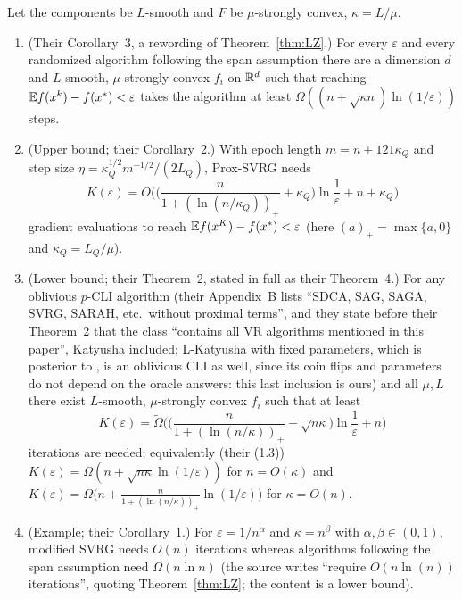 \begin{theorem}
\label{thm:HLOY}
Let the components be $L$-smooth and $F$ be $\mu$-strongly convex, $\kappa=L/\mu$.
\begin{enumerate}[nosep,label=(\alph*)]
\item (Their Corollary~3, a rewording of Theorem~\ref{thm:LZ}.) For every $\varepsilon$ and every randomized algorithm following the span assumption there are a dimension $d$ and $L$-smooth, $\mu$-strongly convex $f_i$ on $\mathbb{R}^d$ such that reaching $\mathbb{E} f(x^k)-f(x^\ast)<\varepsilon$ takes the algorithm at least $\Omega((n+\sqrt{\kappa n})\ln(1/\varepsilon))$ steps.
\item (Upper bound; their Corollary~2.) With epoch length $m=n+121\kappa_Q$ and step size $\eta=\kappa_Q^{1/2}m^{-1/2}/(2L_Q)$, Prox-SVRG needs
\[
K(\varepsilon)=O\Big(\Big(\frac{n}{1+(\ln(n/\kappa_Q))_+}+\kappa_Q\Big)\ln\frac1\varepsilon+n+\kappa_Q\Big)
\]
gradient evaluations to reach $\mathbb{E} f(x^{K})-f(x^\ast)<\varepsilon$ (here $(a)_+=\max\{a,0\}$ and $\kappa_Q=L_Q/\mu$).
\item (Lower bound; their Theorem~2, stated in full as their Theorem~4.) For any oblivious $p$-CLI algorithm (their Appendix~B lists ``SDCA, SAG, SAGA, SVRG, SARAH, etc.\ without proximal terms'', and they state before their Theorem~2 that the class ``contains all VR algorithms mentioned in this paper'', Katyusha included; L-Katyusha with fixed parameters, which is posterior to \cite{hannah2018breaking}, is an oblivious CLI as well, since its coin flips and parameters do not depend on the oracle answers: this last inclusion is ours) and all $\mu,L$ there exist $L$-smooth, $\mu$-strongly convex $f_i$ such that at least
\[
K(\varepsilon)=\tilde\Omega\Big(\Big(\frac{n}{1+(\ln(n/\kappa))_+}+\sqrt{n\kappa}\Big)\ln\frac1\varepsilon+n\Big)
\]
iterations are needed; equivalently (their (1.3)) $K(\varepsilon)=\Omega(n+\sqrt{n\kappa}\ln(1/\varepsilon))$ for $n=O(\kappa)$ and $K(\varepsilon)=\Omega\big(n+\frac{n}{1+(\ln(n/\kappa))_+}\ln(1/\varepsilon)\big)$ for $\kappa=O(n)$.
\item (Example; their Corollary~1.) For $\varepsilon=1/n^\alpha$ and $\kappa=n^\beta$ with $\alpha,\beta\in(0,1)$, modified SVRG needs $O(n)$ iterations whereas algorithms following the span assumption need $\Omega(n\ln n)$ (the source writes ``require $O(n\ln(n))$ iterations'', quoting Theorem~\ref{thm:LZ}; the content is a lower bound).
\end{enumerate}
\end{theorem}

